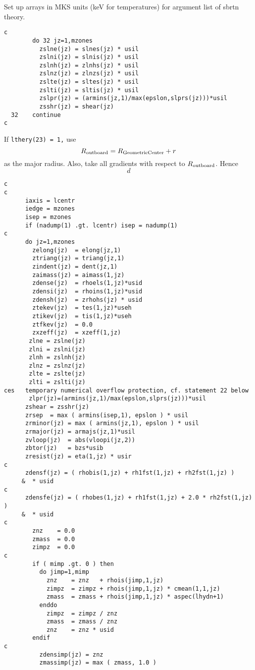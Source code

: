 Set up arrays in MKS units (keV for temperatures)
for argument list of sbrtn theory.


\begin{verbatim}
c
        do 32 jz=1,mzones
          zslne(jz) = slnes(jz) * usil
          zslni(jz) = slnis(jz) * usil
          zslnh(jz) = zlnhs(jz) * usil
          zslnz(jz) = zlnzs(jz) * usil
          zslte(jz) = sltes(jz) * usil
          zslti(jz) = sltis(jz) * usil
          zslpr(jz) = (armins(jz,1)/max(epslon,slprs(jz)))*usil
          zsshr(jz) = shear(jz)
  32    continue
c
\end{verbatim}
If {\tt lthery(23) = 1,} use
\[ R_{\rm outboard} = R_{\rm Geometric Center} + r \]
as the major radius.  Also, take all gradients with respect to
$ R_{\rm outboard} $.  Hence
\[ d \]
\begin{verbatim}
c
c
      iaxis = lcentr
      iedge = mzones
      isep = mzones
      if (nadump(1) .gt. lcentr) isep = nadump(1)
c
      do jz=1,mzones
        zelong(jz)  = elong(jz,1)
        ztriang(jz) = triang(jz,1)
        zindent(jz) = dent(jz,1)
        zaimass(jz) = aimass(1,jz)
        zdense(jz)  = rhoels(1,jz)*usid
        zdensi(jz)  = rhoins(1,jz)*usid
        zdensh(jz)  = zrhohs(jz) * usid
        ztekev(jz)  = tes(1,jz)*useh
        ztikev(jz)  = tis(1,jz)*useh
        ztfkev(jz)  = 0.0
        zxzeff(jz)  = xzeff(1,jz)
       zlne = zslne(jz)
       zlni = zslni(jz)
       zlnh = zslnh(jz)
       zlnz = zslnz(jz)
       zlte = zslte(jz)
       zlti = zslti(jz)
ces   temporary numerical overflow protection, cf. statement 22 below
       zlpr(jz)=(armins(jz,1)/max(epslon,slprs(jz)))*usil
      zshear = zsshr(jz)
      zrsep  = max ( armins(isep,1), epslon ) * usil
      zrminor(jz) = max ( armins(jz,1), epslon ) * usil
      zrmajor(jz) = armajs(jz,1)*usil
      zvloop(jz)  = abs(vloopi(jz,2))
      zbtor(jz)   = bzs*usib
      zresist(jz) = eta(1,jz) * usir
c
      zdensf(jz) = ( rhobis(1,jz) + rh1fst(1,jz) + rh2fst(1,jz) )
     &  * usid
c
      zdensfe(jz) = ( rhobes(1,jz) + rh1fst(1,jz) + 2.0 * rh2fst(1,jz) )
     &  * usid
c
        znz    = 0.0
        zmass  = 0.0
        zimpz  = 0.0
c
        if ( mimp .gt. 0 ) then
          do jimp=1,mimp
            znz    = znz   + rhois(jimp,1,jz)
            zimpz  = zimpz + rhois(jimp,1,jz) * cmean(1,1,jz)
            zmass  = zmass + rhois(jimp,1,jz) * aspec(lhydn+1)
          enddo
            zimpz  = zimpz / znz
            zmass  = zmass / znz
            znz    = znz * usid
        endif
c
          zdensimp(jz) = znz
          zmassimp(jz) = max ( zmass, 1.0 )

\end{verbatim}
